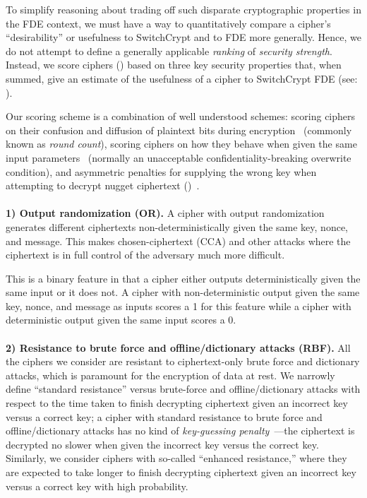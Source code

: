 To simplify reasoning about trading off such disparate cryptographic properties
in the FDE context, we must have a way to quantitatively compare a cipher's
``desirability'' or usefulness to SwitchCrypt and to FDE more generally. Hence, we
do not attempt to define a generally applicable \textit{ranking} of
\emph{security strength}. Instead, we score ciphers
() based on three key security properties
that, when summed, give an estimate of the usefulness of a cipher to SwitchCrypt
FDE (see: ).

Our scoring scheme is a combination of well understood schemes: scoring ciphers
on their confusion and diffusion of plaintext bits during
encryption~\cite{MicrosoftCryptanalysisAES,SchneiersOnRounds} (commonly known as
\emph{round count}), scoring ciphers on how they behave when given the same
input parameters~\cite{random-output1,Freestyle,random-output2} (normally an
unacceptable confidentiality-breaking overwrite condition), and asymmetric
penalties for supplying the wrong key when attempting to decrypt nugget
ciphertext ()~\cite{scrypt,Freestyle,others2}.\\
\\
\textbf{1) Output randomization (OR).} A cipher with output randomization
generates different ciphertexts non-deterministically given the same key, nonce,
and message. This makes chosen-ciphertext (CCA) and other attacks where the
ciphertext is in full control of the adversary much more difficult.

This is a binary feature in that a cipher either outputs deterministically given
the same input or it does not. A cipher with non-deterministic output given the
same key, nonce, and message as inputs scores a 1 for this feature while a
cipher with deterministic output given the same input scores a 0.\\
\\
\textbf{2) Resistance to brute force and offline/dictionary attacks (RBF).}
All the ciphers we consider are resistant to ciphertext-only brute force and
dictionary attacks, which is paramount for the encryption of data at rest. We
narrowly define ``standard resistance'' versus brute-force and
offline/dictionary attacks with respect to the time taken to finish decrypting
ciphertext given an incorrect key versus a correct key; a cipher with standard
resistance to brute force and offline/dictionary attacks has no kind of
\emph{key-guessing penalty}~\cite{Freestyle}---the ciphertext is decrypted no
slower when given the incorrect key versus the correct key. Similarly, we
consider ciphers with so-called ``enhanced resistance,'' where they are expected
to take longer to finish decrypting ciphertext given an incorrect key versus a
correct key with high probability.

